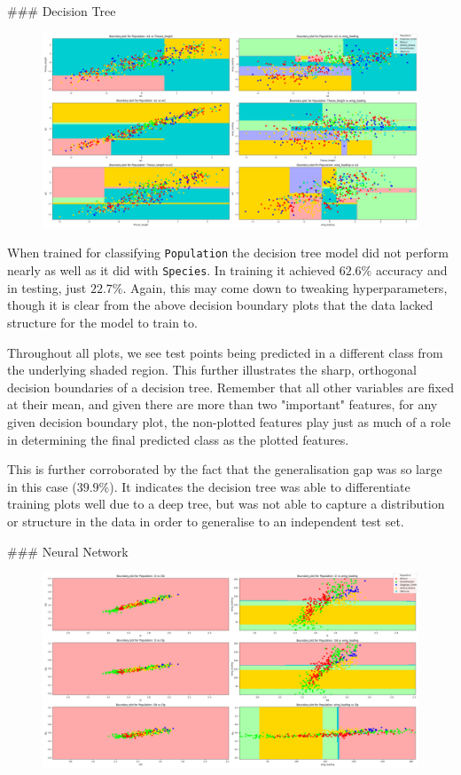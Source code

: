 \documentclass{article}
\begin{document}
### Decision Tree

\begin{figure}
    \centering
    \includegraphics{plots/dt_Thorax_decision_boundaries_Population.png}
    \caption{}
    \label{fig:}
\end{figure}


When trained for classifying \texttt{Population} the decision tree model did not perform nearly as well as it did with \texttt{Species}. In training it achieved $62.6\%$ accuracy and in testing, just $22.7\%$. Again, this may come down to tweaking hyperparameters, though it is clear from the above decision boundary plots that the data lacked structure for the model to train to.

Throughout all plots, we see test points being predicted in a different class from the underlying shaded region. This further illustrates the sharp, orthogonal decision boundaries of a decision tree. Remember that all other variables are fixed at their mean, and given there are more than two "important" features, for any given decision boundary plot, the non-plotted features play just as much of a role in determining the final predicted class as the plotted features. 

This is further corroborated by the fact that the generalisation gap was so large in this case ($39.9\%$). It indicates the decision tree was able to differentiate training plots well due to a deep tree, but was not able to capture a distribution or structure in the data in order to generalise to an independent test set.

### Neural Network

\begin{figure}
    \centering
    \includegraphics{plots/nn_Thorax_decision_boundaries_Population.png}
    \caption{}
    \label{fig:}
\end{figure}
\end{document}
